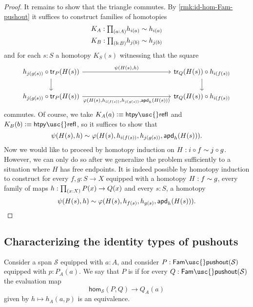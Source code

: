 \begin{proof}
  It remains to show that the triangle commutes. By \cref{rmk:id-hom-Fam-pushout} it suffices to construct families of homotopies
  \begin{align*}
    K_A : \prd{a:A} h_{i(a)}\htpy h_{i(a)} \\
    K_B : \prd{b:B} h_{j(b)}\htpy h_{j(b)}
  \end{align*}
  and for each $s:S$ a homotopy $K_S(s)$ witnessing that the square
  \begin{equation*}
    \begin{tikzcd}[column sep=13em]
      h_{j(g(s))} \circ \mathsf{tr}_P(H(s)) \arrow[d] \arrow[r,"{\psi(H(s),h)}"] & \mathsf{tr}_Q(H(s)) \circ h_{i(f(s))} \arrow[d] \\
      h_{j(g(s))} \circ \mathsf{tr}_P(H(s)) \arrow[r,swap,"{\varphi(H(s),h_{i(f(s))},h_{j(g(s))},\apd{h}{H(s)})}"] & \mathsf{tr}_Q(H(s))\circ h_{i(f(s))}
    \end{tikzcd}
  \end{equation*}
  commutes. Of course, we take $K_A(a)\defeq\mathsf{htpy\usc{}refl}$ and $K_B(b)\defeq\mathsf{htpy\usc{}refl}$, so it suffices to show that
  \begin{equation*}
    \psi(H(s),h)\sim \varphi(H(s),h_{i(f(s))},h_{j(g(s))},\mathsf{apd}_{h}\mathopen{}\left(H(s)\right)\mathclose{}).
  \end{equation*}
  Now we would like to proceed by homotopy induction on $H:i\circ f \sim j\circ g$. However, we can only do so after we generalize the problem sufficiently to a situation where $H$ has free endpoints. It is indeed possible by homotopy induction to construct for every $f,g:S\to X$ equipped with a homotopy $H:f\sim g$, every family of maps $h:\prd{x:X}P(x)\to Q(x)$ and every $s:S$, a homotopy
  \begin{equation*}
    \psi(H(s),h)\sim \varphi(H(s),h_{f(s)},h_{g(s)},\mathsf{apd}_{h}\mathopen{}\left(H(s)\right)\mathclose{}).\qedhere
  \end{equation*}
\end{proof}

\subsection{Characterizing the identity types of pushouts}

\begin{defn}
  Consider a span $\mathcal{S}$ equipped with $a:A$, and consider
  $P:\mathsf{Fam\usc{}pushout}(\mathcal{S})$ equipped with $p:P_A(a)$. We say that $P$ is  if for every $Q:\mathsf{Fam\usc{}pushout}(\mathcal{S})$ the evaluation map
  \begin{equation*}
    \mathsf{hom}_{\mathcal{S}}(P,Q)\to Q_A(a)
  \end{equation*}
  given by $h\mapsto h_A(a,p)$ is an equivalence.
\end{defn}

